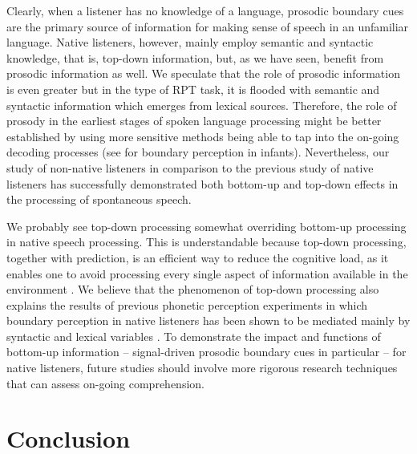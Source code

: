 \documentclass[output=paper]{langscibook}
\begin{document}
    Clearly, when a listener has no knowledge of a language, prosodic boundary cues are the primary source of information for making sense of speech in an unfamiliar language. Native listeners, however, mainly employ semantic and syntactic knowledge, that is, top-down information, but, as we have seen, benefit from prosodic information as well. We speculate that the role of prosodic information is even greater but in the type of RPT task, it is flooded with semantic and syntactic information which emerges from lexical sources. Therefore, the role of prosody in the earliest stages of spoken language processing might be better established by using more sensitive methods being able to tap into the on-going decoding processes (see  for boundary perception in infants). Nevertheless, our study of non-native listeners in comparison to the previous study of native listeners has successfully demonstrated both bottom-up and top-down effects in the processing of spontaneous speech. %

    We probably see top-down processing somewhat overriding bottom-up processing in native speech processing. This is understandable because top-down processing, together with prediction, is an efficient way to reduce the cognitive load, as it enables one to avoid processing every single aspect of information available in the environment \citep[][]{barEtAl2006, clark2016, engelEtAl2001}. We believe that the phenomenon of top-down processing also explains the results of previous phonetic perception experiments in which boundary perception in native listeners has been shown to be mediated mainly by syntactic and lexical variables \citep[e.g.,][]{coleEtAl2010, christodoulidesEtAl2018, baumannWinter2018}. To demonstrate the impact and functions of bottom-up information  --  signal-driven prosodic boundary cues in particular  --  for native listeners, future studies should involve more rigorous research techniques that can assess on-going comprehension.
    
    \section{Conclusion}\largerpage
    
\end{document}
